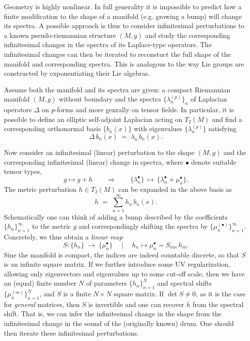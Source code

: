 \begin{mytheorem}
%    
Geometry is highly nonlinear.
In full generality it is impossible to predict how a finite modification to the shape of a manifold (e.g. growing a bump) will change its spectra.
A possible approach is thus to consider infinitesimal perturbations to a known pseudo-riemannian structure $(M,g)$ and study the corresponding infinitesimal changes in the spectra of its Laplace-type operators.
The infinitesimal changes can then be iterated to reconstuct the full shape of the manifold and corresponding spectra.
This is analogous to the way Lie groups are constructed by exponentiating their Lie algebras. 


Assume both the manifold and its spectra are given: a compact Riemannian manifold \((M,g)\) without boundary and the spectra \(\{\lambda_n^{(p)}\}_n\) of Laplacian operators  \(\Delta\) on $p$-forms and more genrally on tensor fields.
%
In particular, it is possible to define an elliptic self-adjoint Laplacian acting on $T_2(M)$ and find a corresponding orthonormal basis \(\{b_n(x)\}\) with eigenvalues \(\{\lambda_n^{(p)}\}\) satisfying
\begin{equation}
 \Delta\, b_n(x) \;=\; \lambda_n\, b_n(x).
\end{equation}

Now consider an infinitesimal (linear) perturbation to the shape $(M,g)$ and the corresponding infinitesimal (linear) change in  spectra, where $\bullet$ denote suitable tensor types,
\begin{equation}
    g\mapsto g+h\qquad \Rightarrow\qquad \{\lambda_n^{\bullet}\}\,\mapsto\,
 \{\lambda_n^{\bullet}+\mu_n^{\bullet}\}.
\end{equation}
%
The metric perturbation \(h\in T_2(M)\) can be expanded in the above basis as
\begin{equation}
 h \;=\; \sum_{n=1}^\infty h_n\, b_n(x).
\end{equation}
Schematically one can think of adding a bump described by the coefficients \(\{h_n\}_{n=1}^\infty\) to the metric \(g\) and correspondingly shifting the spectra by \(\{\mu_n^{(\bullet)}\}_{n=1}^\infty\).
% 
Concretely, we thus obtain a \emph{linear map}
\begin{equation}
    S\colon \{h_n\}\;\longrightarrow\;\{\mu_n^\bullet\}\quad \mid \quad h_n \mapsto \mu_n^\bullet = S_{mn}\,h_m.
\end{equation}
Sine the manifold is compact, the indices are indeed countable discrete, so that $S$ is an infinite square matrix.
If we further introduce some UV regularization, allowing only eigenvectors and eigenvalues up to some cut-off scale, then we have an (equal) finite number $N$ of parameters \(\{h_n\}_{n=1}^N\) and spectral shifts \(\{\mu_n^{(m)}\}_{n=1}^N\), and $S$ is a finite \(N\times N\) square matrix.
If \(\det S\neq 0\), as it is the case for \emph{general} matrices, then \(S\) is invertible and one can recover \(h\) from the spectral shift.
That is, we can infer the infinitesimal change in the shape from the infinitesimal change in the sound of the (originally known) drum.
One should then iterate these infinitesimal perturbations.


\end{mytheorem}
